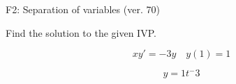 \begin{exercise}
  \begin{exerciseTitle}F2: Separation of variables (ver. 70)\end{exerciseTitle}
  \begin{exerciseStatement}
    
Find the solution to the given IVP.

    
\[xy'= -3 y \hspace{1em} y( 1 ) = 1\]

  \end{exerciseStatement}
  \begin{exerciseAnswer}
    
\[y= 1 t^ -3\]

  \end{exerciseAnswer}
\end{exercise}